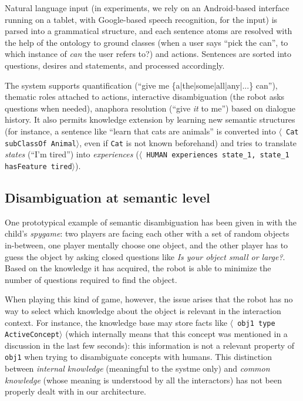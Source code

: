 \documentclass[letterpaper, 10 pt, conference]{ieeeconf}  %
\newcommand{\concept}[1]{{\small \texttt{#1}}}
\newcommand{\stmt}[1]{{\footnotesize \tt $\langle$ #1\relax$\rangle$}}
\begin{document}
Natural language input (in experiments, we rely on an Android-based interface
running on a tablet, with Google-based speech recognition, for the input) is
parsed into a grammatical structure, and each sentence atoms are resolved with
the help of the ontology to ground classes (when a user says ``pick the can'',
to which instance of \emph{can} the user refers to?) and actions. Sentences are
sorted into questions, desires and statements, and processed accordingly.

The system supports quantification (``give me \{a|the|some|all|any|...\} can''),
thematic roles attached to actions, interactive disambiguation (the robot asks
questions when needed), anaphora resolution (``give \emph{it} to me'') based on
dialogue history. It also permits knowledge extension by learning new semantic
structures (for instance, a sentence like ``learn that cats are animals'' is
converted into \stmt{Cat subClassOf Animal}, even if \concept{Cat} is not known
beforehand) and tries to translate \emph{states} (``I'm tired'') into
\emph{experiences} (\stmt{HUMAN experiences state\_1, state\_1 hasFeature
tired}).

\subsection{Disambiguation at semantic level}

One prototypical example of semantic disambiguation has been given in
\cite{Ros2010b} with the child's \emph{spygame}: two players are facing
each other with a set of random objects in-between, one player mentally choose
one object, and the other player has to guess the object by asking closed
questions like \emph{Is your object small or large?}. Based on the knowledge it
has acquired, the robot is able to minimize the number of questions required to
find the object.

When playing this kind of game, however, the issue arises that the robot has no
way to select which knowledge about the object is relevant in the interaction
context. For instance, the knowledge base may store facts like \stmt{obj1 type
ActiveConcept} (which internally means that this concept was mentioned in a
discussion in the last few seconds): this information is not a relevant
property of \concept{obj1} when trying to disambiguate concepts with humans.
This distinction between \emph{internal knowledge} (meaningful to
the systme only) and \emph{common knowledge} (whose meaning is understood by
all the interactors) has not been properly dealt with in our architecture.
\end{document}
